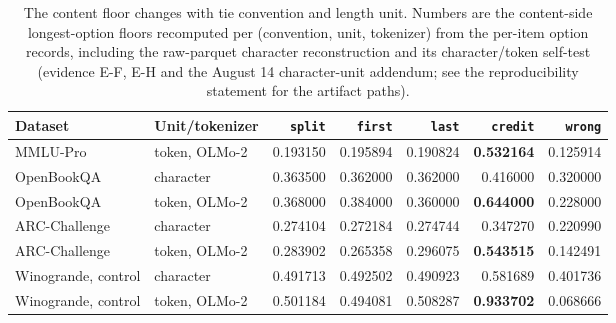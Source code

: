 \begin{table}[!htbp]
\centering
\small
\setlength{\tabcolsep}{4.5pt}
\begin{tabular}{llrrrrr}
\toprule
Dataset & Unit/tokenizer & \texttt{split} & \texttt{first} & \texttt{last} & \texttt{credit} & \texttt{wrong} \\
\midrule
MMLU-Pro & token, OLMo-2 & 0.193150 & 0.195894 & 0.190824 & \textbf{0.532164} & 0.125914 \\
OpenBookQA & character & 0.363500 & 0.362000 & 0.362000 & 0.416000 & 0.320000 \\
OpenBookQA & token, OLMo-2 & 0.368000 & 0.384000 & 0.360000 & \textbf{0.644000} & 0.228000 \\
ARC-Challenge & character & 0.274104 & 0.272184 & 0.274744 & 0.347270 & 0.220990 \\
ARC-Challenge & token, OLMo-2 & 0.283902 & 0.265358 & 0.296075 & \textbf{0.543515} & 0.142491 \\
Winogrande, control & character & 0.491713 & 0.492502 & 0.490923 & 0.581689 & 0.401736 \\
Winogrande, control & token, OLMo-2 & 0.501184 & 0.494081 & 0.508287 & \textbf{0.933702} & 0.068666 \\
\bottomrule
\end{tabular}
\caption{The content floor changes with tie convention and length unit. Numbers are the content-side longest-option floors recomputed per (convention, unit, tokenizer) from the per-item option records, including the raw-parquet character reconstruction and its character/token self-test (evidence \textsf{E-F}, \textsf{E-H} and the August 14 character-unit addendum; see the reproducibility statement for the artifact paths).}
\label{tab:conventions}
\end{table}
